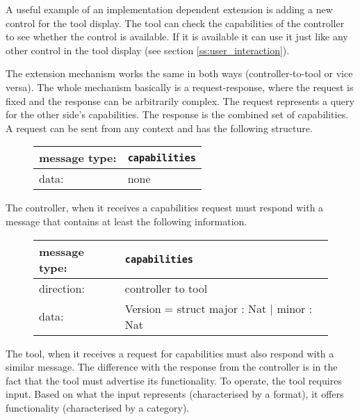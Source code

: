 \documentclass{article}
\newcommand{\msg}[1]{\texttt{#1}}
\begin{document}
   A useful example of an implementation dependent extension is adding a new
   control for the tool display. The tool can check the capabilities of the
   controller to see whether the control is available. If it is available it
   can use it just like any other control in the tool display (see section
   \ref{ss:user_interaction}).

   The extension mechanism works the same in both ways (controller-to-tool or
   vice versa). The whole mechanism basically is a request-response, where the
   request is fixed and the response can be arbitrarily complex. The request
   represents a query for the other side's capabilities. The response is the
   combined set of capabilities. A request can be sent from any context and has
   the following structure.

   \begin{figure}[H]
    \begin{center}
     \begin{tabular}{|ll|}
      \hline
      message type:    & \msg{capabilities} \\
      \hline
      data:            & none \\
      \hline
     \end{tabular}
    \end{center}
   \end{figure}

   The controller, when it receives a capabilities request must respond with a
   message that contains at least the following information.

   \begin{figure}[H]
    \begin{center}
     \begin{tabular}{|ll|}
      \hline
       message type:   & \msg{capabilities} \\
      \hline
       direction:      & controller to tool \\
       data:           & Version = struct major : Nat $|$ minor : Nat \\
      \hline
     \end{tabular}
    \end{center}
   \end{figure}

   \noindent The tool, when it receives a request for capabilities must also respond with
   a similar message. The difference with the response from the controller is
   in the fact that the tool must advertise its functionality. To operate, the
   tool requires input. Based on what the input represents (characterised by a
   format), it offers functionality (characterised by a category).
   
\end{document}
